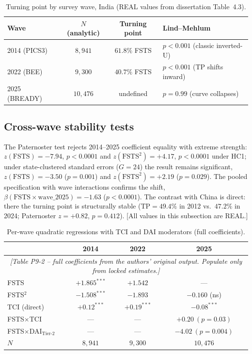 \documentclass[12pt,a4paper]{article}
\begin{document}
\begin{table}[H]
\centering
\caption{Turning point by survey wave, India (REAL values from dissertation
Table~4.3).}
\begin{tabularx}{\textwidth}{lccX}
\toprule
Wave & $N$ (analytic) & Turning point & Lind--Mehlum \\
\midrule
2014 (PICS3)  & $8{,}941$  & $61.8\%$ FSTS & $p<0.001$ (classic inverted-U) \\
2022 (BEE)    & $9{,}300$  & $40.7\%$ FSTS & $p<0.001$ (TP shifts inward) \\
2025 (BREADY) & $10{,}476$ & undefined     & $p=0.99$ (curve collapses) \\
\bottomrule
\end{tabularx}
\end{table}

\subsection{Cross-wave stability tests}
The Paternoster test rejects 2014--2025 coefficient equality with extreme
strength: $z(\mathrm{FSTS})=-7.94$, $p<0.0001$ and
$z(\mathrm{FSTS}^2)=+4.17$, $p<0.0001$ under HC1; under state-clustered
standard errors ($G=24$) the result remains significant,
$z(\mathrm{FSTS})=-3.50$ ($p=0.001$) and $z(\mathrm{FSTS}^2)=+2.19$
($p=0.029$). The pooled specification with wave interactions confirms the
shift, $\beta(\mathrm{FSTS}\times\mathrm{wave}\_2025)=-1.63$ ($p<0.0001$).
The contrast with China is direct: there the turning point is structurally
stable ($\mathrm{TP}=49.4\%$ in 2012 vs.\ $47.2\%$ in 2024; Paternoster
$z=+0.82$, $p=0.412$). [All values in this subsection are REAL.]

\begin{table}[H]
\centering
\caption{Per-wave quadratic regressions with TCI and DAI moderators
(full coefficients).}
\begin{tabularx}{\textwidth}{Xccc}
\toprule
 & 2014 & 2022 & 2025 \\
\midrule
\multicolumn{4}{c}{\itshape [Table P9-2 -- full coefficients from the authors'
original output. Populate only from locked estimates.]}\\
FSTS         & $+1.865^{***}$ & $+1.542$ & --- \\
FSTS$^2$     & $-1.508^{***}$ & $-1.893$ & $-0.160$ (ns) \\
TCI (direct) & $+0.12^{***}$  & $+0.19^{***}$ & $-0.08^{***}$ \\
FSTS$\times$TCI & --- & --- & $+0.20\ (p=0.03)$ \\
FSTS$\times$DAI$_{\text{Tier-2}}$ & --- & --- & $-4.02\ (p=0.004)$ \\
$N$          & $8{,}941$ & $9{,}300$ & $10{,}476$ \\
\bottomrule
\end{tabularx}
\end{table}
\end{document}

